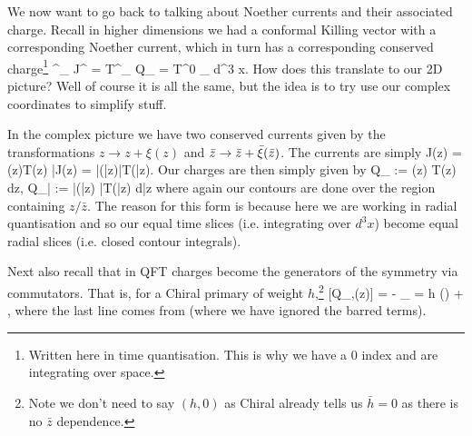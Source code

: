 We now want to go back to talking about Noether currents and their associated charge. Recall in higher dimensions we had a conformal Killing vector with a corresponding Noether current, which in turn has a corresponding conserved charge\footnote{Written here in time quantisation. This is why we have a $0$ index and are integrating over space.}
\bse 
    \xi^{\nu}\p_{\nu} \longrightarrow J^{\mu} = T^{\mu\nu}\xi_{\nu} \longrightarrow Q_{\xi} = \int T^{0\nu} \xi_{\nu} d^3 x.
\ese 
How does this translate to our 2D picture? Well of course it is all the same, but the idea is to try use our complex coordinates to simplify stuff. 

In the complex picture we have two conserved currents given by the transformations $z\to z + \xi(z) $ and $\Bar{z} \to \Bar{z}+\Bar{\xi}(\bar{z})$. The currents are simply 
\bse 
    J(z) = \xi(z)T(z) \qand \bar{J}(z) = \bar{\xi}(\bar{z})\bar{T}(\bar{z}).
\ese
Our charges are then simply given by
\bse 
    Q_{\xi} :=  \oint \xi(z) T(z) dz, \qand Q_{\bar{\xi}} :=  \oint \bar{\xi}(\bar{z}) \bar{T}(\bar{z}) d\bar{z}
\ese
where again our contours are done over the region containing $z/\bar{z}$. The reason for this form is because here we are working in radial quantisation and so our equal time slices (i.e. integrating over $d^3x$) become equal radial slices (i.e. closed contour integrals).

Next also recall that in QFT charges become the generators of the symmetry via commutators. That is, for a Chiral primary of weight $h$,\footnote{Note we don't need to say $(h,0)$ as Chiral already tells us $\bar{h}=0$ as there is no $\bar{z}$ dependence.}
\be 
\label{eqn:QPhiCommutator}
    [Q_{\xi},\Phi(z)] = - \del_{\xi} \Phi = h (\p \xi) \Phi + \xi \p \Phi,
\ee 
where the last line comes from  (where we have ignored the barred terms). 

